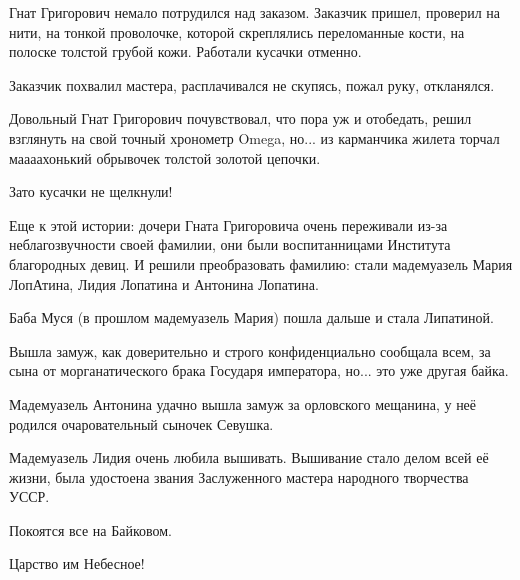Гнат Григорович немало потрудился над заказом. Заказчик пришел, проверил на
нити, на тонкой проволочке, которой скреплялись переломанные кости, на полоске
толстой грубой кожи. Работали кусачки отменно.

Заказчик похвалил мастера, расплачивался не скупясь, пожал руку, откланялся.

Довольный Гнат Григорович почувствовал, что пора уж и отобедать, решил
взглянуть на свой  точный хронометр Omega, но... из карманчика жилета торчал
маааахонький обрывочек толстой золотой цепочки.

Зато кусачки не щелкнули!

Еще к этой истории: дочери Гната Григоровича очень переживали из-за
неблагозвучности своей фамилии, они были воспитанницами Института благородных
девиц. И решили преобразовать фамилию:  стали мадемуазель Мария ЛопАтина,
Лидия Лопатина и Антонина Лопатина.

Баба Муся (в прошлом мадемуазель Мария) пошла дальше и стала Липатиной.

Вышла замуж, как доверительно и строго конфиденциально сообщала всем,  за сына
от морганатического брака Государя императора, но... это уже другая байка.

Мадемуазель Антонина удачно вышла замуж за орловского мещанина, у неё родился
очаровательный сыночек Севушка.

Мадемуазель Лидия очень любила вышивать. Вышивание стало делом всей её жизни,
была удостоена звания Заслуженного мастера народного творчества УССР.

Покоятся все на Байковом.

Царство им Небесное!


